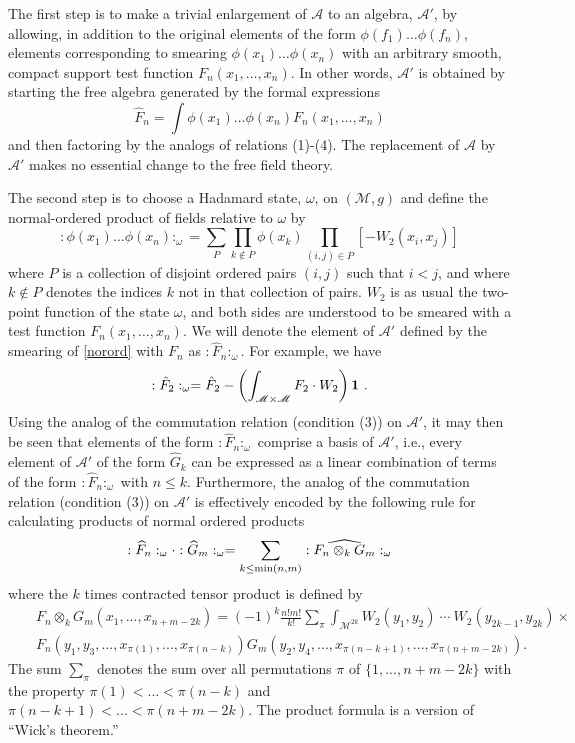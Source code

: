 \documentclass[12pt]{article}
\newcommand{\eA}{\mathscr{A}}
\newcommand{\M}{\mathscr{M}}
\newcommand{\myid}{{\bf 1}}
\theoremstyle{plain}
\theoremstyle{definition}
\def\ben{\begin{equation}}
\def\een{\end{equation}}
\def\bena{\begin{eqnarray}}
\def\eena{\end{eqnarray}}
\def\non{\nonumber}
\begin{document}
The first step is to make a trivial enlargement of $\eA$ to an algebra, $\eA'$, by allowing, in addition to the original elements of the form $\phi(f_1) \dots \phi(f_n)$, elements
corresponding to smearing $\phi(x_1) \dots \phi(x_n)$ with an arbitrary smooth, compact support test function
$F_n (x_1, \dots, x_n)$. In other words, $\eA'$ is obtained by starting the free algebra generated by the formal expressions
\ben\label{fn}
\hat{F}_n = \int \phi(x_1) \dots \phi(x_n) F_n (x_1, \dots, x_n)
\een
and then factoring by the analogs of relations (1)-(4). The replacement of $\eA$ by $\eA'$
makes no essential change to the free field theory.

The second step is to choose a Hadamard state, $\omega$, on $(\M, g)$ and define the normal-ordered product of fields relative to $\omega$ by
\ben
:\phi(x_1) \dots \phi(x_n):_{\omega} = \sum_P \prod_{k \notin P} \phi(x_k) \prod_{(i,j) \in P} [-W_2(x_i, x_j)]
\label{norord}
\een
where $P$ is a collection of disjoint ordered pairs $(i,j)$ such that $i<j$, and where $k \notin P$ denotes the indices $k$ not in
that collection  of pairs.  $W_2$ is as usual the two-point function of the state $\omega$, and both sides are understood to be smeared with a test function $F_n (x_1, \dots, x_n)$.  We will
denote the element of $\eA'$ defined by the smearing of \eqref{norord} with $F_n$ as $:\hat{F}_n:_{\omega}$. For example, we have
\ben
:\hat{F}_2:_{\omega} = \hat{F}_2 - \left( \int_{\M \times \M} F_2 \cdot W_2 \right) \myid  \ .
\een
Using the analog of the commutation relation (condition (3)) on $\eA'$, it may then be seen that elements of the form
$:\hat{F}_n:_{\omega}$ comprise a basis of $\eA'$, i.e., every element of $\eA'$ of the form $\hat{G}_k$ can be expressed as a linear combination of terms of the form $:\hat{F}_n:_{\omega}$ with $n \leq k$. Furthermore, the analog of the commutation relation (condition (3)) on $\eA'$ is effectively encoded by the following rule for calculating products of normal ordered products
\ben
:\widehat{F}_n:_{\omega}  \cdot :\widehat{G}_m:_{\omega} = \sum_{k \le {\rm min}(n,m)}  : \widehat{F_n \otimes_k G_m} :_\omega
\label{wick}
\een
where the $k$ times contracted tensor product is defined by
\bena\label{wick1}
&&F_n \otimes_k G_m(x_1, ..., x_{n+m-2k}) = (-1)^k \frac{n!m!}{k!}
\sum_{ \pi} \int_{\M^{2k}} W_2(y_1, y_2) \ \cdots \ W_2(y_{2k-1}, y_{2k}) \times  \non \\
&& F_n(y_1, y_3, ..., x_{\pi(1)}, ..., x_{\pi(n-k)}) G_m(y_2, y_4, ..., x_{\pi(n-k+1)}, ..., x_{\pi(n+m-2k)}) . 
\eena
The sum $\sum_\pi$ denotes the sum over all permutations $\pi$ of $\{1, ..., n+m-2k\}$ with the
property  $\pi(1)<...<\pi(n-k)$ and $\pi(n-k+1)<...<\pi(n+m-2k)$.
The product formula is a version of ``Wick's theorem.''
\end{document}
